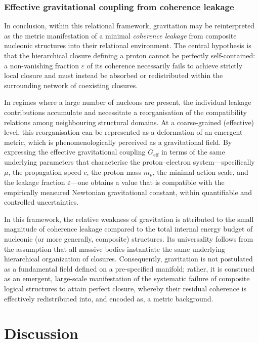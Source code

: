 \documentclass[11pt,a4paper]{article}
\begin{document}
\subsubsection{Effective gravitational coupling from coherence leakage}

In conclusion, within this relational framework, gravitation may be reinterpreted as the metric manifestation of a minimal \emph{coherence leakage} from composite nucleonic structures into their relational environment. The central hypothesis is that the hierarchical closure defining a proton cannot be perfectly self-contained: a non-vanishing fraction \(\varepsilon\) of its coherence necessarily fails to achieve strictly local closure and must instead be absorbed or redistributed within the surrounding network of coexisting closures.

In regimes where a large number of nucleons are present, the individual leakage contributions accumulate and necessitate a reorganisation of the compatibility relations among neighbouring structural domains. At a coarse-grained (effective) level, this reorganisation can be represented as a deformation of an emergent metric, which is phenomenologically perceived as a gravitational field. By expressing the effective gravitational coupling \(G_{\mathrm{eff}}\) in terms of the same underlying parameters that characterise the proton–electron system—specifically \(\mu\), the propagation speed \(c\), the proton mass \(m_p\), the minimal action scale, and the leakage fraction \(\varepsilon\)—one obtains a value that is compatible with the empirically measured Newtonian gravitational constant, within quantifiable and controlled uncertainties.

In this framework, the relative weakness of gravitation is attributed to the small magnitude of coherence leakage compared to the total internal energy budget of nucleonic (or more generally, composite) structures. Its universality follows from the assumption that all massive bodies instantiate the same underlying hierarchical organization of closures. Consequently, gravitation is not postulated as a fundamental field defined on a pre-specified manifold; rather, it is construed as an emergent, large-scale manifestation of the systematic failure of composite logical structures to attain perfect closure, whereby their residual coherence is effectively redistributed into, and encoded as, a metric background.

\section{Discussion}
\end{document}

